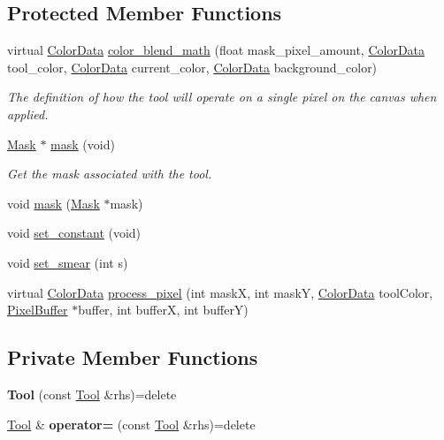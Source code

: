 \subsection*{Protected Member Functions}
\begin{DoxyCompactItemize}
\item 
virtual \hyperlink{classimage__tools_1_1ColorData}{Color\+Data} \hyperlink{classimage__tools_1_1Tool_adca00cc3d94a4ca7bdf15d323754e105}{color\+\_\+blend\+\_\+math} (float mask\+\_\+pixel\+\_\+amount, \hyperlink{classimage__tools_1_1ColorData}{Color\+Data} tool\+\_\+color, \hyperlink{classimage__tools_1_1ColorData}{Color\+Data} current\+\_\+color, \hyperlink{classimage__tools_1_1ColorData}{Color\+Data} background\+\_\+color)
\begin{DoxyCompactList}\small\item\em The definition of how the tool will operate on a single pixel on the canvas when applied. \end{DoxyCompactList}\item 
\hyperlink{classimage__tools_1_1Mask}{Mask} $\ast$ \hyperlink{classimage__tools_1_1Tool_a3002c5364aa984eec6e25a1c842dae2f}{mask} (void)
\begin{DoxyCompactList}\small\item\em Get the mask associated with the tool. \end{DoxyCompactList}\item 
void \hyperlink{classimage__tools_1_1Tool_a18145cb816dd3d56f87f4ddab7ce3ab3}{mask} (\hyperlink{classimage__tools_1_1Mask}{Mask} $\ast$mask)
\item 
void \hyperlink{classimage__tools_1_1Tool_ab3a25d0708b0c4cd36b9545a3c22531a}{set\+\_\+constant} (void)
\item 
void \hyperlink{classimage__tools_1_1Tool_a7a388418aa1df58f39347f07728db81a}{set\+\_\+smear} (int s)
\item 
virtual \hyperlink{classimage__tools_1_1ColorData}{Color\+Data} \hyperlink{classimage__tools_1_1Tool_a9e601f030f0956796810616445e395f0}{process\+\_\+pixel} (int maskX, int maskY, \hyperlink{classimage__tools_1_1ColorData}{Color\+Data} tool\+Color, \hyperlink{classimage__tools_1_1PixelBuffer}{Pixel\+Buffer} $\ast$buffer, int bufferX, int bufferY)
\end{DoxyCompactItemize}
\subsection*{Private Member Functions}
\begin{DoxyCompactItemize}
\item 
{\bfseries Tool} (const \hyperlink{classimage__tools_1_1Tool}{Tool} \&rhs)=delete\hypertarget{classimage__tools_1_1Tool_adc8752459db983c80f255a8d5dc0a94b}{}\label{classimage__tools_1_1Tool_adc8752459db983c80f255a8d5dc0a94b}

\item 
\hyperlink{classimage__tools_1_1Tool}{Tool} \& {\bfseries operator=} (const \hyperlink{classimage__tools_1_1Tool}{Tool} \&rhs)=delete\hypertarget{classimage__tools_1_1Tool_a61c5da6d429a933acf7d3932c6368e5a}{}\label{classimage__tools_1_1Tool_a61c5da6d429a933acf7d3932c6368e5a}

\end{DoxyCompactItemize}

